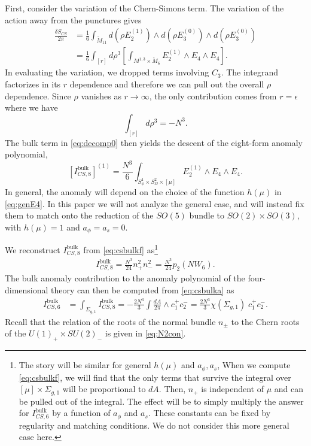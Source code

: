 \documentclass[a4paper,11pt]{article}
\newcommand{\ba}[1]{\begin{align} #1 \end{align} }
\begin{document}
First, consider the variation of the Chern-Simons term. The variation of the action away from the punctures gives
\begin{align}
\frac{\delta S_{CS}}{2\pi} &=\frac{1}{6} \int_{\widetilde{M}_{11}} d \left(\rho {E}_2^{(1)} \right) \wedge d \left(\rho {E}_3^{(0)} \right) \wedge d \left(\rho {E}_3^{(0)} \right) \\
&= \frac{1}{6} \int_{[r]} d\rho^3 \left[  \int_{M^{1,3}\times \widetilde{M}_6} {E}_2^{(1)} \wedge {E}_4 \wedge  {E}_4    \right]. \label{eq:varcs}
\end{align} In evaluating the variation, we dropped terms involving $C_3$.  The integrand factorizes in its $r$ dependence and therefore we can pull out the overall $\rho$ dependence. 
 Since $\rho$ vanishes as $r\to \infty$, the only contribution comes from $r=\epsilon$ where we have
\begin{equation}
\int_{[r]} d\rho^3 = -N^3. \label{eq:rho}
\end{equation}
The bulk term in \eqref{eq:decomp0} then yields the descent of the eight-form anomaly polynomial,
\begin{equation}
\left[I_{CS,8}^{\text{bulk}} \right]^{(1)}  = \frac{N^3}{6}\int_{S^1_\phi\times S^2_\Omega\times[\mu]}{E}_2^{(1)}\wedge {E}_4\wedge {E}_4.\label{eq:csbulkf}
\end{equation}
In general, the anomaly will depend on the choice of the function $h(\mu)$ in \eqref{eq:genE4}.  In this paper we will not analyze the general case, and will instead fix them to match onto the reduction of the $SO(5)$ bundle to $SO(2)\times SO(3)$, with $h(\mu)=1$ and $a_\phi = a_s=0$.

We reconstruct $I_{CS,8}^{\text{bulk}}$ from \eqref{eq:csbulkf} as\footnote{The story will be similar for general $h(\mu)$ and $a_\phi,a_s$, When we compute \eqref{eq:csbulkf}, we will find that the only terms that survive the integral over $[\mu]\times \Sigma_{g,1}$ will be proportional to $dA$. Then, $n_+$ is independent of $\mu$ and can be pulled out of the integral. The effect will be to simply multiply the answer for $I_{CS,6}^{\text{bulk}}$ by a function of $a_\phi$ and $a_s$. These constants can be fixed by regularity and matching conditions.
We do not consider this more general case here.}
	\ba{
	I_{CS,8}^{\text{bulk}} =\frac{N^3}{24} {n_+^2n_-^2}=  \frac{N^3}{24} {p_2(NW_6)}.\label{eq:csbulka}
	}
The bulk anomaly contribution to the anomaly polynomial of the four-dimensional theory can then be computed from \eqref{eq:csbulka} as
\begin{align}
I_{CS,6}^{\text{bulk}} &= \int_{\Sigma_{g,1}} I_{CS,8}^{\text{bulk}} = - \frac{2N^3}{3} \int \frac{dA}{2\pi}\wedge c_1^+ c_2^- = \frac{2N^3}{3} \chi(\Sigma_{g,1}) \;   c_1^+ c_2^-. \label{eq:IbulkCS}
\end{align}
Recall that the relation of the roots of the normal bundle $n_\pm$ to the Chern roots of the $U(1)_+ \times SU(2)_-$ is given in \eqref{eq:N2con}. 
\end{document}
